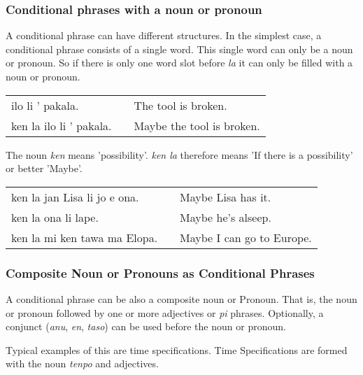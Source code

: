 %
\subsubsection*{Conditional phrases with a noun or pronoun}
%
%
A conditional phrase can have different structures. 
In the simplest case, a conditional phrase consists of a single word. 
This single word can only be a noun or pronoun. 
So if there is only one word slot before \textit{la} it can only be filled with a noun or pronoun. 

\begin{supertabular}{p{5,5cm}|ll}
ilo li ' pakala. && The tool is broken. \\
ken la ilo li ' pakala. && Maybe the tool is broken. \\
\end{supertabular} 

The noun \textit{ken} means 'possibility'.
\textit{ken la} therefore means 'If there is a possibility' or better 'Maybe'.
 
\begin{supertabular}{p{5,5cm}|ll}
ken la jan Lisa li jo e ona. && Maybe Lisa has it. \\
ken la ona li lape. && Maybe he's alseep. \\
ken la mi ken tawa ma Elopa. && Maybe I can go to Europe. \\
\end{supertabular} 

%
%
\subsubsection*{Composite Noun or Pronouns as Conditional Phrases}
%
%
A conditional phrase can be also a composite noun or Pronoun. 
That is, the noun or pronoun followed by one or more adjectives or \textit{pi} phrases.
Optionally, a conjunct (\textit{anu}, \textit{en}, \textit{taso}) can be used before the noun or pronoun. 

Typical examples of this are time specifications. 
Time Specifications are formed with the noun \textit{tenpo} and adjectives. 

